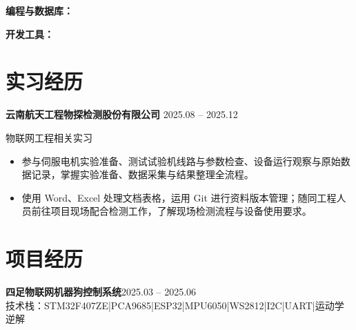 \documentclass[10pt,a4paper]{article}
\newcommand{\projectblock}[3]{%
    {\bfseries\color{darktext}#1}\hfill{\color{graytext}#2}\\%
    {\small\color{graytext}#3}%
    \vspace{0.2em}%
}
\begin{document}
\vspace{2pt}

{\bfseries\color{primary}编程与数据库：}

\vspace{2pt}

{\bfseries\color{primary}开发工具：}

\section{\faBriefcase\hspace{0.4em}实习经历}

{\bfseries 云南航天工程物探检测股份有限公司}\hfill{\color{graytext} 2025.08 -- 2025.12}

{\small\color{graytext}物联网工程相关实习}

\vspace{2pt}

\begin{itemize}[leftmargin=1.5em, itemsep=2pt, parsep=0pt, topsep=2pt]
    \item 参与伺服电机实验准备、测试试验机线路与参数检查、设备运行观察与原始数据记录，掌握实验准备、数据采集与结果整理全流程。
    \item 使用 Word、Excel 处理文档表格，运用 Git 进行资料版本管理；随同工程人员前往项目现场配合检测工作，了解现场检测流程与设备使用要求。
\end{itemize}

\vspace{0.15em}

\section{\faProjectDiagram\hspace{0.4em}项目经历}

\projectblock{四足物联网机器狗控制系统}{2025.03 -- 2025.06}{技术栈：STM32F407ZE\hspace{0.3em}|\hspace{0.3em}PCA9685\hspace{0.3em}|\hspace{0.3em}ESP32\hspace{0.3em}|\hspace{0.3em}MPU6050\hspace{0.3em}|\hspace{0.3em}WS2812\hspace{0.3em}|\hspace{0.3em}I2C\hspace{0.3em}|\hspace{0.3em}UART\hspace{0.3em}|\hspace{0.3em}运动学逆解}
\end{document}
